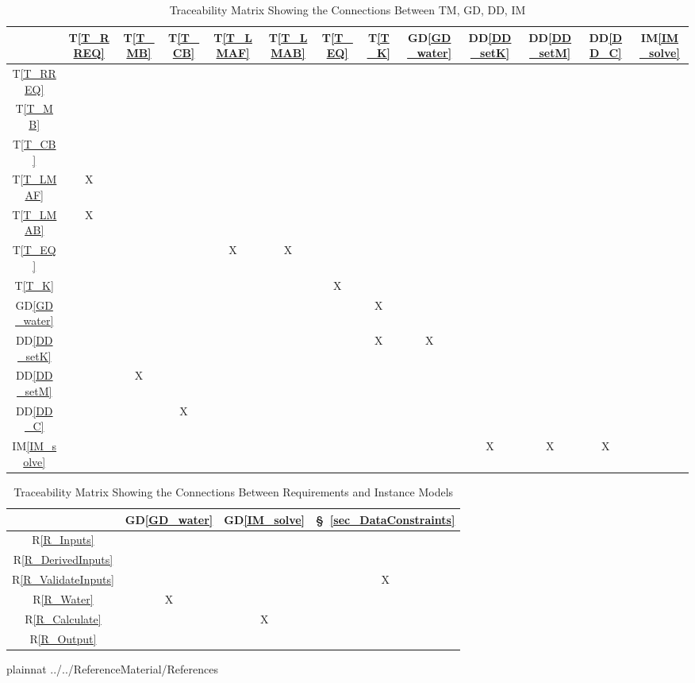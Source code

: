 \documentclass[12pt]{article}
\newcommand{\dref}[1]{GD\ref{#1}}
\newcommand{\ddref}[1]{DD\ref{#1}}
\newcommand{\tref}[1]{T\ref{#1}}
\newcommand{\iref}[1]{IM\ref{#1}}
\newcommand{\rref}[1]{R\ref{#1}}
\newcommand{\sref}[1]{\S~\ref{#1}}
\begin{document}
\begin{table}[h!]
\centering
\begin{tabular}{|c|c|c|c|c|c|c|c|c|c|c|c|c|}
\hline        
	& \tref{T_RREQ}& \tref{T_MB}& \tref{T_CB}& \tref{T_LMAF}& \tref{T_LMAB} & \tref{T_EQ}& \tref{T_K} & \dref{GD_water}& \ddref{DD_setK}& \ddref{DD_setM}& \ddref{DD_C}& \iref{IM_solve} \\
\hline
\tref{T_RREQ}    & & & & & & & & & & & & \\ \hline
\tref{T_MB}      & & & & & & & & & & & & \\ \hline
\tref{T_CB}      & & & & & & & & & & & & \\ \hline
\tref{T_LMAF}    &X& & & & & & & & & & & \\ \hline
\tref{T_LMAB}    &X& & & & & & & & & & & \\ \hline
\tref{T_EQ}      & & & &X&X& & & & & & & \\ \hline
\tref{T_K}       & & & & & &X& & & & & & \\ \hline
\dref{GD_water}  & & & & & & &X& & & & & \\ \hline
\ddref{DD_setK}  & & & & & & &X&X& & & & \\ \hline
\ddref{DD_setM}  & &X& & & & & & & & & & \\ \hline
\ddref{DD_C}     & & &X& & & & & & & & & \\ \hline
\iref{IM_solve}  & & & & & & & & &X&X&X& \\
\hline
\end{tabular}
\caption{Traceability Matrix Showing the Connections Between TM, GD, DD, IM}
\label{Table:trace}
\end{table}

\begin{table}[h!]
\centering
\begin{tabular}{|c|c|c|c|}
\hline
	& \dref{GD_water}& \dref{IM_solve}& \sref{sec_DataConstraints} \\
\hline
\rref{R_Inputs}     & & &\\ \hline
\rref{R_DerivedInputs}    & & &\\ \hline
\rref{R_ValidateInputs}   & & &X\\ \hline
\rref{R_Water}  &X & &\\ \hline
\rref{R_Calculate}     & &X &\\ \hline 
\rref{R_Output}       & & & \\ 
\hline
\end{tabular}
\caption{Traceability Matrix Showing the Connections Between Requirements and Instance Models}
\label{Table:R_trace}
\end{table}

\newpage
\newpage

 {plainnat}
 {../../ReferenceMaterial/References}

~\newline

\end{document}
